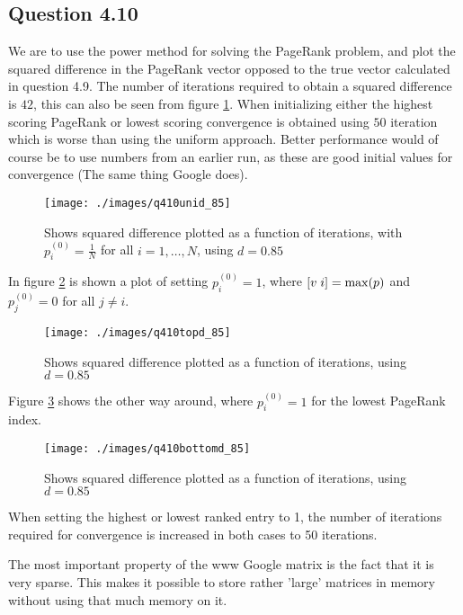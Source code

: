 \subsection*{Question 4.10}

We are to use the power method for solving the PageRank problem, and
plot the squared difference in the PageRank vector opposed to the true
vector calculated in question 4.9. The number of iterations required
to obtain a squared difference is $42$, this can also be seen from
figure \ref{fig:q410unid_85}. When initializing either the highest
scoring PageRank or lowest scoring convergence is obtained using $50$
iteration which is worse than using the uniform approach. Better
performance would of course be to use numbers from an earlier run, as
these are good initial values for convergence (The same thing Google
does).

\begin{figure}[!htbp]
  \centering \texttt{[image: ./images/q410unid\_85]}
  \caption{Shows squared difference plotted as a function of
    iterations, with $p_i^{(0)} = \frac{1}{N}$ for all $i=1,\ldots,N$,
    using $d = 0.85$}
  \label{fig:q410unid_85}
\end{figure}

In figure \ref{fig:q410topd_85} is shown a plot of setting $p_i^{(0)}
= 1$, where $[v \hspace{0.1cm} i] = \max(p)$ and $p_j^{(0)} = 0$ for
all $j \neq i$.

\begin{figure}[!htbp]
  \centering \texttt{[image: ./images/q410topd\_85]}
  \caption{Shows squared difference plotted as a function of
    iterations, using $d = 0.85$}
  \label{fig:q410topd_85}
\end{figure}

Figure \ref{fig:q410bottomd_85} shows the other way around, where
$p_i^{(0)} = 1$ for the lowest PageRank index.

\begin{figure}[!htbp]
  \centering \texttt{[image: ./images/q410bottomd\_85]}
  \caption{Shows squared difference plotted as a function of
    iterations, using $d = 0.85$}
  \label{fig:q410bottomd_85}
\end{figure}

When setting the highest or lowest ranked entry to 1, the number of
iterations required for convergence is increased in both cases to 50
iterations.

The most important property of the www Google matrix is the fact that
it is very sparse. This makes it possible to store rather 'large'
matrices in memory without using that much memory on it.
